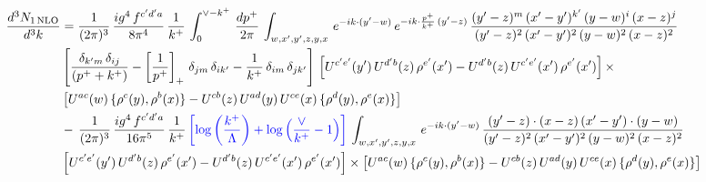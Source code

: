\documentclass[9pt]{article}
\numberwithin{equation}{section}
\begin{document}
\begin{align}
     \frac{d^{3}N_{1\,\rm NLO}}{d^{3}k} & = \frac{1}{(2\pi)^{3}}\, \frac{ig^{4}\,f^{c'd'a}}{8\pi^{4}}\, \frac{1}{k^{+}}\,\int_{0}^{\vee-k^{+}}\,  \frac{dp^{+}}{2\pi}\, \int_{w,x',y',z,y,x}\, e^{-ik\cdot (y'-w)}\, e^{-ik\cdot \frac{p^{+}}{k^{+}}\,(y'-z)}\,\frac{(y'-z)^{m}\,(x'-y')^{k'}\,(y-w)^{i}\,(x-z)^{j}}{(y'-z)^{2}\,(x'-y')^{2}\,(y-w)^{2}\,(x-z)^{2}}\notag \\ & \left[\frac{\delta_{k'm}\,\delta_{ij}}{(p^{+}+k^{+})}-\left[\frac{1}{p^{+}}\right]_{+}\,\delta_{jm}\,\delta_{ik'}-\frac{1}{k^{+}}\, \delta_{im}\, \delta_{jk'}\right]\, \left[U^{c'e'}(y')\,U^{d'b}(z)\,\rho^{e'}(x')-U^{d'b}(z)\,U^{c'e'}(x')\,\rho^{e'}(x')\right]\times\notag \\ &  \left[U^{ac}(w)\, \{\rho^{c}(y),\rho^{b}(x)\}-U^{cb}(z)\,U^{ad}(y)\,U^{ce}(x)\,\{\rho^{d}(y),\rho^{e}(x)\}\right]\notag \\ & -\,\frac{1}{(2\pi)^{3}}\, \frac{ig^{4}\,f^{c'd'a}}{16\pi^{5}}\, \frac{1}{k^{+}}\,{\color{blue}\left[\log{\left(\frac{k^{+}}{\Lambda}\right)}+\log{\left(\frac{\vee}{k^{+}}-1\right)}\right]}\, \int_{w,x',y',z,y,x}\, e^{-ik\cdot (y'-w)}\,\frac{(y'-z)\cdot (x-z)\,(x'-y')\cdot (y-w)}{(y'-z)^{2}\,(x'-y')^{2}\,(y-w)^{2}\,(x-z)^{2}}\notag \\ &  \left[U^{c'e'}(y')\,U^{d'b}(z)\,\rho^{e'}(x')-U^{d'b}(z)\,U^{c'e'}(x')\,\rho^{e'}(x')\right]\times  \left[U^{ac}(w)\, \{\rho^{c}(y),\rho^{b}(x)\}-U^{cb}(z)\,U^{ad}(y)\,U^{ce}(x)\,\{\rho^{d}(y),\rho^{e}(x)\}\right]
\end{align} 
\end{document}
